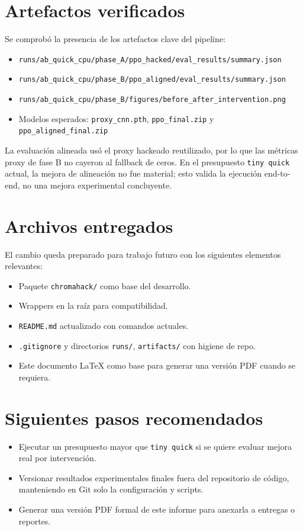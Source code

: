\documentclass[11pt]{article}
\begin{document}
\section{Artefactos verificados}
Se comprob\'o la presencia de los artefactos clave del pipeline:

\begin{itemize}
    \item \texttt{runs/ab\_quick\_cpu/phase\_A/ppo\_hacked/eval\_results/summary.json}
    \item \texttt{runs/ab\_quick\_cpu/phase\_B/ppo\_aligned/eval\_results/summary.json}
    \item \texttt{runs/ab\_quick\_cpu/phase\_B/figures/before\_after\_intervention.png}
    \item Modelos esperados: \texttt{proxy\_cnn.pth}, \texttt{ppo\_final.zip} y \texttt{ppo\_aligned\_final.zip}
\end{itemize}

La evaluaci\'on alineada us\'o el proxy hackeado reutilizado, por lo que las m\'etricas proxy de fase B no cayeron al fallback de ceros. En el presupuesto \texttt{tiny quick} actual, la mejora de alineaci\'on no fue material; esto valida la ejecuci\'on end-to-end, no una mejora experimental concluyente.

\section{Archivos entregados}
El cambio queda preparado para trabajo futuro con los siguientes elementos relevantes:

\begin{itemize}
    \item Paquete \texttt{chromahack/} como base del desarrollo.
    \item Wrappers en la ra\'iz para compatibilidad.
    \item \texttt{README.md} actualizado con comandos actuales.
    \item \texttt{.gitignore} y directorios \texttt{runs/}, \texttt{artifacts/} con higiene de repo.
    \item Este documento \LaTeX{} como base para generar una versi\'on PDF cuando se requiera.
\end{itemize}

\section{Siguientes pasos recomendados}
\begin{itemize}
    \item Ejecutar un presupuesto mayor que \texttt{tiny quick} si se quiere evaluar mejora real por intervenci\'on.
    \item Versionar resultados experimentales finales fuera del repositorio de c\'odigo, manteniendo en Git solo la configuraci\'on y scripts.
    \item Generar una versi\'on PDF formal de este informe para anexarla a entregas o reportes.
\end{itemize}
\end{document}
